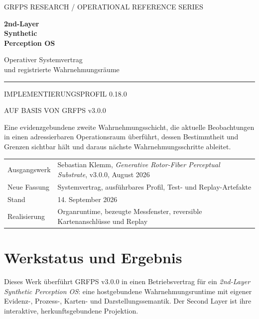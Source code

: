 \documentclass[11pt,a4paper]{article}
\begin{document}
\hypersetup{pageanchor=false}\begin{titlepage}
\color{ink}
{\small\textsf{GRFPS RESEARCH / OPERATIONAL REFERENCE SERIES}}
\vspace{24mm}

{\fontsize{38}{43}\selectfont\bfseries 2nd-Layer\\Synthetic\\Perception OS\par}
\vspace{9mm}
{\Large Operativer Systemvertrag\\und registrierte Wahrnehmungsräume\par}
\vspace{13mm}
{\color{accent}\rule{\linewidth}{1.5pt}}
\vspace{7mm}
{\large\textsf{IMPLEMENTIERUNGSPROFIL 0.18.0}\par}
{\large\textsf{AUF BASIS VON GRFPS v3.0.0}\par}
\vspace{12mm}
\begin{minipage}{.92\linewidth}
Eine evidenzgebundene zweite Wahrnehmungsschicht, die aktuelle Beobachtungen
in einen adressierbaren Operationsraum überführt, dessen Bestimmtheit und
Grenzen sichtbar hält und daraus nächste Wahrnehmungsschritte ableitet.
\end{minipage}
\vfill
\begin{tabularx}{\linewidth}{@{}lY@{}}
Ausgangswerk & Sebastian Klemm, \emph{Generative Rotor-Fiber Perceptual Substrate}, v3.0.0, August 2026\\
Neue Fassung & Systemvertrag, ausführbares Profil, Test- und Replay-Artefakte\\
Stand & 14. September 2026\\
Realisierung & Organruntime, bezeugte Messfenster, reversible Kartenanschlüsse und Replay\\
\end{tabularx}
\end{titlepage}\hypersetup{pageanchor=true}

\section*{Werkstatus und Ergebnis}
Dieses Werk überführt GRFPS v3.0.0 in einen Betriebsvertrag für ein
\emph{2nd-Layer Synthetic Perception OS}: eine hostgebundene
Wahrnehmungsruntime mit eigener Evidenz-, Prozess-, Karten- und
Darstellungssemantik. Der Second Layer ist ihre interaktive,
herkunftsgebundene Projektion.
\end{document}
